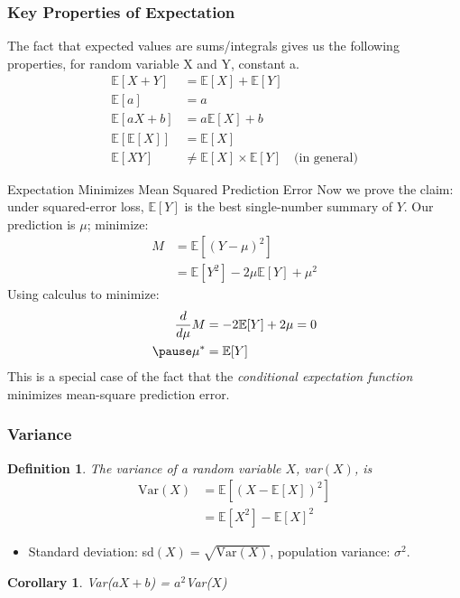 \documentclass[aspectratio=169, handout, t]{beamer}
\newtheorem{defn}{Definition}
\newtheorem{cor}{Corollary}
\numberwithin{equation}{section}
\begin{document}
\begin{frame}
\frametitle{Key Properties of Expectation}
The fact that expected values are sums/integrals gives us the following properties, for random variable X and Y, constant a.
\begin{align*}
\mathbb{E}[X+Y]&=\mathbb{E}[X]+\mathbb{E}[Y]\\[6pt]
\mathbb{E}[a]&=a\\[6pt]
\mathbb{E}[aX+b]&=a\mathbb{E}[X]+b\\[6pt]
\mathbb{E}[\mathbb{E}[X]]&=\mathbb{E}[X]\\[6pt]
\mathbb{E}[XY]&\neq \mathbb{E}[X]\times \mathbb{E}[Y] \quad \text{(in general)}
\end{align*}
\end{frame}


\begin{frame}{Expectation Minimizes Mean Squared Prediction Error}
Now we prove the claim: under squared-error loss, $\mathbb{E}[Y]$ is the best single-number summary of $Y$. Our prediction is $\mu$; minimize:
\begin{align*}
M &= \mathbb{E}[(Y-\mu)^2]\\
&=\mathbb{E}[Y^2]-2\mu \mathbb{E}[Y]+ \mu^2
\end{align*}\pause
Using calculus to minimize:\pause
\begin{align*}
\frac{d }{d \mu}M&=-2\mathbb{E}[Y]+ 2\mu = 0\\ \pause
\mu^*&=\mathbb{E}[Y]
\end{align*}\pause
This is a special case of the fact that the \emph{conditional expectation function} minimizes mean-square prediction error.
\end{frame}

\begin{frame}
\frametitle{Variance}

\begin{defn}
The variance of a random variable $X$, var$(X)$, is
\begin{align*}
 \text{Var}(X) &= \mathbb{E}[(X - \mathbb{E}[X])^2]  \\
 &=   \mathbb{E}[X^2] - \mathbb{E}[X]^2
\end{align*}
\end{defn}

\begin{itemize}
\item Standard deviation: sd$(X) = \sqrt{\text{Var}(X)} $, population variance: $\sigma^2$.
\end{itemize}

\begin{cor}
Var($aX  + b$)  = $a^2$Var($X$)
\end{cor}

\end{frame}
\end{document}
